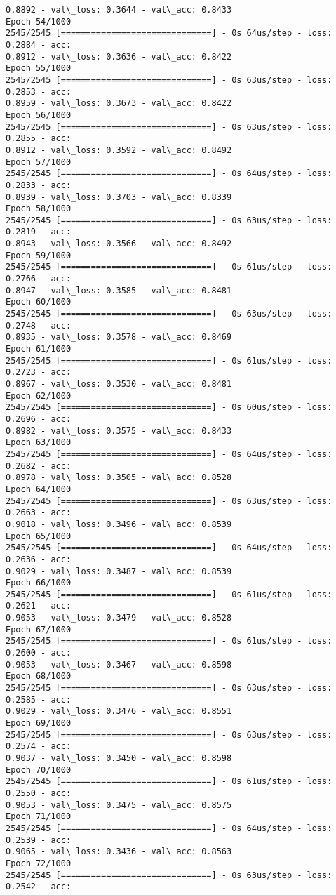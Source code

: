 \documentclass[11pt]{article}
\begin{document}
\begin{Verbatim}[commandchars=\\\{\}]
0.8892 - val\_loss: 0.3644 - val\_acc: 0.8433
Epoch 54/1000
2545/2545 [==============================] - 0s 64us/step - loss: 0.2884 - acc:
0.8912 - val\_loss: 0.3636 - val\_acc: 0.8422
Epoch 55/1000
2545/2545 [==============================] - 0s 63us/step - loss: 0.2853 - acc:
0.8959 - val\_loss: 0.3673 - val\_acc: 0.8422
Epoch 56/1000
2545/2545 [==============================] - 0s 63us/step - loss: 0.2855 - acc:
0.8912 - val\_loss: 0.3592 - val\_acc: 0.8492
Epoch 57/1000
2545/2545 [==============================] - 0s 64us/step - loss: 0.2833 - acc:
0.8939 - val\_loss: 0.3703 - val\_acc: 0.8339
Epoch 58/1000
2545/2545 [==============================] - 0s 63us/step - loss: 0.2819 - acc:
0.8943 - val\_loss: 0.3566 - val\_acc: 0.8492
Epoch 59/1000
2545/2545 [==============================] - 0s 61us/step - loss: 0.2766 - acc:
0.8947 - val\_loss: 0.3585 - val\_acc: 0.8481
Epoch 60/1000
2545/2545 [==============================] - 0s 63us/step - loss: 0.2748 - acc:
0.8935 - val\_loss: 0.3578 - val\_acc: 0.8469
Epoch 61/1000
2545/2545 [==============================] - 0s 61us/step - loss: 0.2723 - acc:
0.8967 - val\_loss: 0.3530 - val\_acc: 0.8481
Epoch 62/1000
2545/2545 [==============================] - 0s 60us/step - loss: 0.2696 - acc:
0.8982 - val\_loss: 0.3575 - val\_acc: 0.8433
Epoch 63/1000
2545/2545 [==============================] - 0s 64us/step - loss: 0.2682 - acc:
0.8978 - val\_loss: 0.3505 - val\_acc: 0.8528
Epoch 64/1000
2545/2545 [==============================] - 0s 63us/step - loss: 0.2663 - acc:
0.9018 - val\_loss: 0.3496 - val\_acc: 0.8539
Epoch 65/1000
2545/2545 [==============================] - 0s 64us/step - loss: 0.2636 - acc:
0.9029 - val\_loss: 0.3487 - val\_acc: 0.8539
Epoch 66/1000
2545/2545 [==============================] - 0s 61us/step - loss: 0.2621 - acc:
0.9053 - val\_loss: 0.3479 - val\_acc: 0.8528
Epoch 67/1000
2545/2545 [==============================] - 0s 61us/step - loss: 0.2600 - acc:
0.9053 - val\_loss: 0.3467 - val\_acc: 0.8598
Epoch 68/1000
2545/2545 [==============================] - 0s 63us/step - loss: 0.2585 - acc:
0.9029 - val\_loss: 0.3476 - val\_acc: 0.8551
Epoch 69/1000
2545/2545 [==============================] - 0s 63us/step - loss: 0.2574 - acc:
0.9037 - val\_loss: 0.3450 - val\_acc: 0.8598
Epoch 70/1000
2545/2545 [==============================] - 0s 61us/step - loss: 0.2550 - acc:
0.9053 - val\_loss: 0.3475 - val\_acc: 0.8575
Epoch 71/1000
2545/2545 [==============================] - 0s 64us/step - loss: 0.2539 - acc:
0.9065 - val\_loss: 0.3436 - val\_acc: 0.8563
Epoch 72/1000
2545/2545 [==============================] - 0s 63us/step - loss: 0.2542 - acc:

\end{Verbatim}
\end{document}
